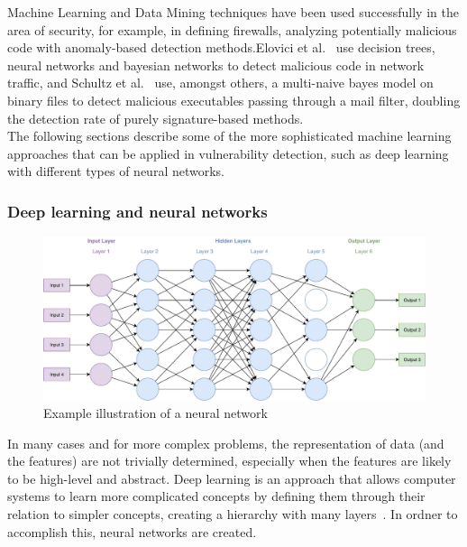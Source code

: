 \documentclass[
a4paper,
pagesize,
pdftex,
12pt,
twoside, %
BCOR=5mm, %
ngerman,
fleqn,
final,
]{scrartcl}
\begin{document}
	Machine Learning and Data Mining techniques have been used successfully in the area of security, for example, in defining firewalls, analyzing potentially malicious code with anomaly-based detection methods.Elovici et al.~\cite{Elovici.2007} use decision trees, neural networks and bayesian networks to detect malicious code in network traffic, and Schultz et al.~\cite{Schultz.2000} use, amongst others, a multi-naive bayes model on binary files to detect malicious executables passing through a mail filter, doubling the detection rate of purely signature-based methods.\\
	The following sections describe some of the more sophisticated machine learning approaches that can be applied in vulnerability detection, such as deep learning with different types of neural networks. 
	
	\subsubsection{Deep learning and neural networks}\label{Deep-Learning}
	\begin{figure}[ht]
		\centering
		\includegraphics[width=\linewidth]{img/NeuralNetwork}
		\caption{Example illustration of a neural network}
		\label{fig:neuralnetwork}
	\end{figure}
	In many cases and for more complex problems, the representation of data (and the features) are not trivially determined, especially when the features are likely to be high-level and abstract. Deep learning is an approach that allows computer systems to learn more complicated concepts by defining them through their relation to simpler concepts, creating a hierarchy with many layers~\cite{Goodfellow.2016}.	In ordner to accomplish this, neural networks are created.\\
\end{document}
